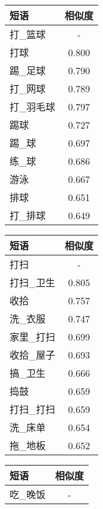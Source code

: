 \begin{table}[h]
\centering
\begin{subtable}{0.25\textwidth}
     \begin{tabular}{|l|c|} 
	\hline
	{\heiti 短语} & {\heiti 相似度} \\
	\hline
	打\_篮球 & - \\
	\hline
	打球 & 0.800 \\
	\hline
	踢\_足球 & 0.790 \\
	\hline
	打\_网球 & 0.789 \\
	\hline
	打\_羽毛球 & 0.797 \\
	\hline
	踢球 & 0.727 \\
	\hline
	踢\_球 & 0.697 \\
	\hline
	练\_球 & 0.686  \\
	\hline
	游泳 & 0.667 \\
	\hline
	排球 & 0.651 \\
	\hline
	打\_排球 & 0.649 \\
	\hline
	\end{tabular}
\end{subtable}
\hspace{1em}
\begin{subtable}{0.25\textwidth}
	\begin{tabular}{|l|c|} 
	\hline
	{\heiti 短语} & {\heiti 相似度} \\
	\hline
	打扫 & - \\
	\hline
	打扫\_卫生 & 0.805 \\
	\hline
	收拾 & 0.757 \\
	\hline
	洗\_衣服 & 0.747 \\
	\hline
	家里\_打扫 & 0.699 \\
	\hline
	收拾\_屋子 & 0.693 \\
	\hline
	搞\_卫生 & 0.666 \\
	\hline
	捣鼓 & 0.659 \\
	\hline
	打扫\_打扫 & 0.659 \\
	\hline
	洗\_床单 & 0.654 \\
	\hline
	拖\_地板 & 0.652 \\
	\hline
	\end{tabular}
\end{subtable}
\hspace{1em}
\begin{subtable}{0.25\textwidth}
	\begin{tabular}{|l|c|} 
	\hline
	{\heiti 短语} & {\heiti 相似度} \\
	\hline
	吃\_晚饭 & - \\

\end{tabular}
\end{subtable}
\end{table}
